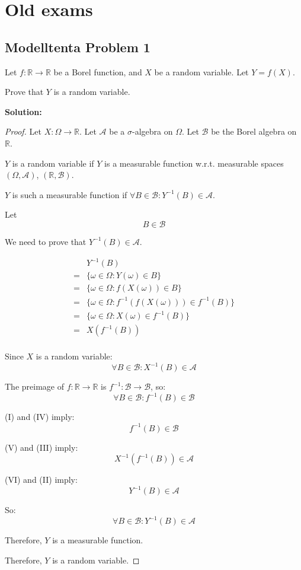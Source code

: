 \documentclass{article}
\begin{document}
\section{Old exams}
\subsection{Modelltenta Problem 1}

Let \(f : \mathbb{R} \to \mathbb{R}\) be a Borel function, and \(X\) be a
random variable. Let \(Y = f(X)\).

Prove that \(Y\) is a random variable.

\textbf{Solution:}

\begin{proof}
Let \(X:\Omega\to \mathbb{R}\).
Let \(\mathcal{A}\) be a \(\sigma\)-algebra on \(\Omega\).
Let \(\mathcal{B}\) be the Borel algebra on \(\mathbb{R}\).

\(Y\) is a random variable if \(Y\) is a measurable function w.r.t. measurable
spaces \((\Omega, \mathcal{A})\), \((\mathbb{R}, \mathcal{B})\).

\(Y\) is such a measurable function if \(\forall B\in \mathcal{B}: Y^{-1}(B)\in \mathcal{A}\).

Let
\[B\in \mathcal{B}\tag{I}\]

We need to prove that \(Y^{-1}(B)\in \mathcal{A}\).

\begin{align*}
	 & Y^{-1}(B) \\
	=& \{\omega\in \Omega: Y(\omega)\in B\} \\
	=& \{\omega\in \Omega: f(X(\omega))\in B\} \\
	=& \{\omega\in \Omega: f^{-1}(f(X(\omega)))\in f^{-1}(B)\} \\
	=& \{\omega\in \Omega: X(\omega)\in f^{-1}(B)\} \\
	=& X(f^{-1}(B)) \tag{II} \\
\end{align*}

Since \(X\) is a random variable:
\[\forall B\in \mathcal{B}: X^{-1}(B)\in \mathcal{A} \tag{III}\]

The preimage of \(f:\mathbb{R}\to\mathbb{R}\) is \(f^{-1}: \mathcal{B} \to\mathcal{B}\), so:
\[\forall B \in \mathcal{B}: f^{-1}(B)\in \mathcal{B} \tag{IV}\]

(I) and (IV) imply:
\[f^{-1}(B) \in \mathcal{B} \tag{V}\]

(V) and (III) imply:
\[X^{-1}(f^{-1}(B))\in \mathcal{A}\tag{VI}\]

(VI) and (II) imply:
\[Y^{-1}(B) \in \mathcal{A}\]

So:
\[\forall B\in \mathcal{B}:Y^{-1}(B) \in \mathcal{A}\]

Therefore, \(Y\) is a measurable function.

Therefore, \(Y\) is a random variable.
\end{proof}
\end{document}
